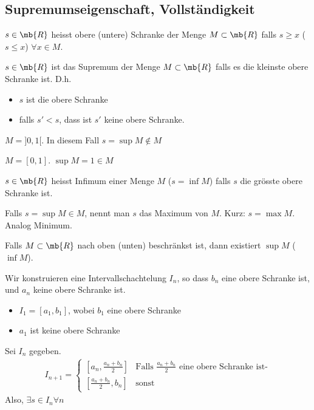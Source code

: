 \subsection{Supremumseigenschaft, Vollständigkeit}
\begin{Def}
  $s\in\mb{R}$ heisst obere (untere) Schranke der Menge $M\subset \mb{R}$ falls $s\geq x$ ($s\leq x$) $\forall x\in M$.
\end{Def}
\begin{Def}
  $s\in\mb{R}$ ist das Supremum der Menge $M\subset\mb{R}$ falls es die kleinste obere Schranke ist. D.h.
  \begin{itemize}
    \item $s$ ist die obere Schranke
    \item falls $s'<s$, dass ist $s'$ keine obere Schranke.
  \end{itemize}
\end{Def}
\begin{Bsp}
  $M=]0,1[$. In diesem Fall $s=\sup M\not\in M$
\end{Bsp}
\begin{Bsp}
  $M=[0,1]$. $\sup M=1\in M$
\end{Bsp}
\begin{Def}
  $s\in\mb{R}$ heisst Infimum einer Menge $M$ ($s=\inf M$) falls $s$ die grösste obere Schranke ist.
\end{Def}
\begin{Def}
  Falls $s=\sup M\in M$, nennt man $s$ das Maximum von $M$. Kurz: $s=\max M$. Analog Minimum.
\end{Def}
\begin{Sat}
  Falls $M\subset \mb{R}$ nach oben (unten) beschränkst ist, dann existiert $\sup M$ ($\inf M$).
\end{Sat}
\begin{Bew}
  Wir konstruieren eine Intervallschachtelung $I_n$, so dass $b_n$ eine obere Schranke ist, und $a_n$ keine obere Schranke ist.
  \begin{itemize}
    \item $I_1=[a_1, b_1]$, wobei $b_1$ eine obere Schranke
    \item $a_1$ ist keine obere Schranke
  \end{itemize}
  Sei $I_n$ gegeben. 
  \begin{align*}
    I_{n+1} = \begin{cases}
      \left[ a_n,\frac{a_n+b_n}{2} \right]&\text{Falls $\frac{a_n+b_n}{2}$ eine obere Schranke ist-}\\
      \left[ \frac{a_n+b_n}{2}, b_n \right]&\text{sonst}
    \end{cases}
  \end{align*}
  Also, $\exists s\in I_n\forall n$
\end{Bew}
